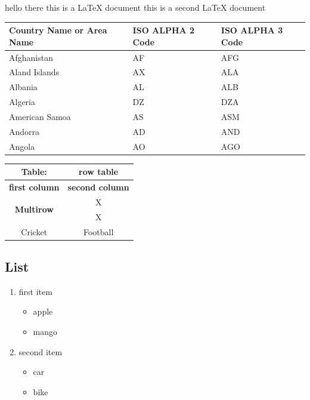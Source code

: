 \documentclass[13pt, letterpaper]{article}
\begin{document}
hello there
this is a \LaTeX{} document
this is a second \LaTeX{} document


\begin{table}[h!]
    \centering
    \begin{tabular}{|p{3cm}|p{3cm}|p{3cm}| }
        \hline
        Country Name or Area Name & ISO ALPHA 2 Code & ISO ALPHA 3 Code \\
        \hline
        Afghanistan               & AF               & AFG              \\
        Aland Islands             & AX               & ALA              \\
        \hline
        Albania                   & AL               & ALB              \\
        Algeria                   & DZ               & DZA              \\
        American Samoa            & AS               & ASM              \\
        Andorra                   & AD               & AND              \\
        Angola                    & AO               & AGO              \\
        \hline
    \end{tabular}
    \label{tab:my_label}
\end{table}

\begin{table}[h!]
    \centering
    \begin{tabular}{c c}
        Table:                             & row table              \\
        \hline
        \textbf{first column}              & \textbf{second column} \\
        \multirow{2}{*}{\textbf{Multirow}} & X                      \\
                                           & X                      \\
        Cricket                            & Football               \\
        \hline
    \end{tabular}
\end{table}

\subsection{List}
\begin{enumerate}
    \item first item
          \begin{itemize}
              \item apple
              \item mango
          \end{itemize}
    \item second item
          \begin{itemize}
              \item car
              \item bike
          \end{itemize}
\end{enumerate}
\end{document}

